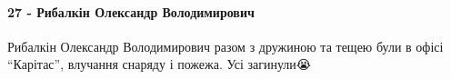  
 
 
 
 

\paragraph{27 - Рибалкін Олександр Володимирович}

\raggedcolumns
\begin{multicols}{2} %
\setlength{\parindent}{0pt}

\begin{itemize} %

Рибалкін Олександр Володимирович разом з дружиною та тещею були в офісі
\enquote{Карітас}, влучання снаряду і пожежа. Усі загинули😭

\end{itemize} %

\end{multicols} %
